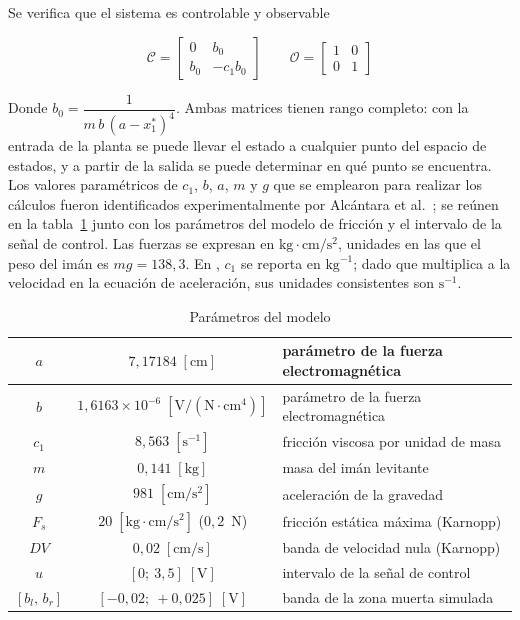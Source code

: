 Se verifica que el sistema es controlable y observable

\[
\mathcal{C}
=
\begin{bmatrix}
0 & b_0\\[6pt]
b_0 & -c_1 b_0
\end{bmatrix}
\qquad
\mathcal{O}
=
\begin{bmatrix}
1 & 0\\[6pt]
0 & 1
\end{bmatrix}
\]

Donde $b_0 = \dfrac{1}{m\,b\,(a-x_1^{\ast})^4}$. Ambas matrices tienen rango completo: con la entrada de la planta se puede llevar el estado a cualquier punto del espacio de estados, y a partir de la salida se puede determinar en qué punto se encuentra.
Los valores paramétricos de $c_1$, $b$, $a$, $m$ y $g$ que se emplearon para realizar los cálculos fueron identificados experimentalmente por Alcántara et al.\ \cite{diana_tesis}; se reúnen en la tabla~\ref{tab:parametros} junto con los parámetros del modelo de fricción y el intervalo de la señal de control. Las fuerzas se expresan en $\text{kg}\cdot\text{cm}/\text{s}^2$, unidades en las que el peso del imán es $mg = 138{,}3$. En \cite{diana_tesis}, $c_1$ se reporta en $\text{kg}^{-1}$; dado que multiplica a la velocidad en la ecuación de aceleración, sus unidades consistentes son $\text{s}^{-1}$.

\begin{table}[ht]
\centering
\caption{Parámetros del modelo}
\label{tab:parametros}
\begin{tabular}{|c|c|l|}
\hline
$a$ & $7{,}17184\;[\text{cm}]$ & parámetro de la fuerza electromagnética \\ \hline
$b$ & $1{,}6163 \times 10^{-6}\;[\text{V}/(\text{N}\cdot\text{cm}^4)]$ & parámetro de la fuerza electromagnética \\ \hline
$c_1$ & $8{,}563\;[\text{s}^{-1}]$ & fricción viscosa por unidad de masa \\ \hline
$m$ & $0{,}141\;[\text{kg}]$ & masa del imán levitante \\ \hline
$g$ & $981\;[\text{cm}/\text{s}^2]$ & aceleración de la gravedad \\ \hline
$F_s$ & $20\;[\text{kg}\cdot\text{cm}/\text{s}^2]$ ($0{,}2$~N) & fricción estática máxima (Karnopp) \\ \hline
$DV$ & $0{,}02\;[\text{cm}/\text{s}]$ & banda de velocidad nula (Karnopp) \\ \hline
$u$ & $[0;\ 3{,}5]\;[\text{V}]$ & intervalo de la señal de control \\ \hline
$[b_l,\,b_r]$ & $[-0{,}02;\ +0{,}025]\;[\text{V}]$ & banda de la zona muerta simulada \\ \hline
\end{tabular}
\end{table}


